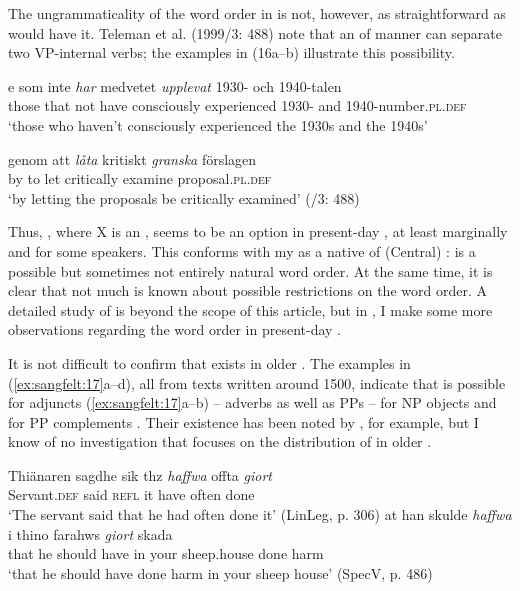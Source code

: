 \documentclass[output=paper, colorlinks, citecolor=brown]{langscibook}
\begin{document}
The ungrammaticality of the word order in  is not, however, as straightforward as \citet{Petzell2011} would have it. Teleman et al. (1999/3: 488) note that an  of manner can separate two VP-internal verbs; the examples in (16a–b) illustrate this possibility.


\ea {}\label{ex:sangfelt:16}
\ea\label{ex:sangfelt:16a}
\gll [d]e som inte \textit{har} {medvetet} \textit{upplevat } 1930- och 1940-talen \\
 those that not have consciously experienced 1930- and 1940-number\textsc{.pl.def}\\
\glt ‘those who haven’t consciously experienced the 1930s and the 1940s’

\ex\label{ex:sangfelt:16b}
\gll genom att \textit{låta} {kritiskt} \textit{granska} förslagen \\
 by to let critically examine proposal.\textsc{pl.def}\\
 \glt ‘by letting the proposals be critically examined’ (\citealt{TelemanEtAl1999}/3: 488)\\
\z
\z

Thus, , where X is an , seems to be an option in present-day , at least marginally and for some speakers. This conforms with my  as a native  of (Central) :  is a possible but sometimes not entirely natural word order. At the same time, it is clear that not much is known about possible restrictions on the word order. A detailed study of  is beyond the scope of this article, but in , I make some more observations regarding the word order in present-day .

It is not difficult to confirm that  exists in older . The examples in (\ref{ex:sangfelt:17}a–d), all from texts written around 1500, indicate that  is possible for adjuncts (\ref{ex:sangfelt:17}a–b) – adverbs as well as PPs – for NP objects  and for PP complements . Their existence has been noted by \citet[171--172]{Falk1993}, for example, but I know of no investigation that focuses on the distribution of  in older .


\ea {}\label{ex:sangfelt:17}
\ea\label{ex:sangfelt:17a}
\gll Thiänaren sagdhe sik thz \textit{haffwa} {offta} \textit{giort} \\
 Servant.\textsc{def} said \textsc{refl} it have often done\\
\glt ‘The servant said that he had often done it’ (LinLeg, p. 306)
\ex\label{ex:sangfelt:17b}
\gll at han skulde \textit{haffwa} i {thino} {farahws} \textit{giort} skada \\
 that he should have in your sheep.house done harm\\
\glt ‘that he should have done harm in your sheep house’ (SpecV, p. 486)
\end{document}
